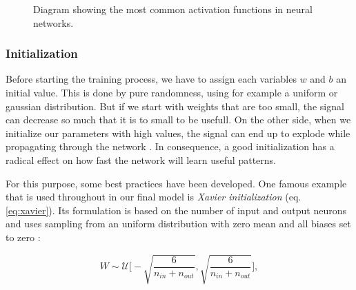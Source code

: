 \begin{figure}[htpb]
  \centering
  \caption[Activation functions]{Diagram showing the most common activation functions in neural networks.}\label{fig:activations}
\end{figure}

\subsubsection{Initialization}

Before starting the training process, we have to assign each variables $ w $ and $ b $ an initial value. This is done by pure randomness, using for example a uniform or gaussian distribution. But if we start with weights that are too small, the signal can decrease so much that it is to small to be usefull. On the other side, when we initialize our parameters with high values, the signal can end up to explode while propagating through the network \parencite{understand_xavier}. In consequence, a good initialization has a radical effect on how fast the network will learn useful patterns.

For this purpose, some best practices have been developed. One famous example that is used throughout in our final model is \textit{Xavier initialization} (eq. \ref{eq:xavier}). Its formulation is based on the number of input and output neurons and uses sampling from an uniform distribution with zero mean and all biases set to zero \parencite{xavier-init}:

\begin{equation} \label{eq:xavier}
  W \sim \mathcal{U} \bigg[-\sqrt{\frac{6}{n_{in} + n_{out}}}, \sqrt{\frac{6}{n_{in} + n_{out}}}\bigg] ,
\end{equation}

